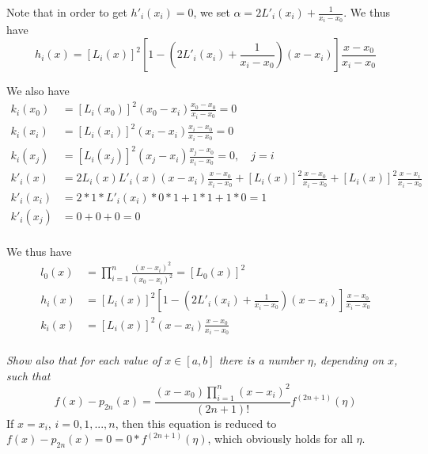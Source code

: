 Note that in order to get $h'_i(x_i) = 0$, we set $\alpha = 2L'_i(x_i) + \frac{1}{x_i - x_0}$. We thus have
\begin{equation*}
    h_i(x) = \left[ L_i(x) \right]^2 \left[1 - \left(2L'_i(x_i) + \frac{1}{x_i - x_0}\right)(x - x_i)\right] \frac{x - x_0}{x_i - x_0}
\end{equation*}

We also have 
\begin{align*}
    k_i(x_0) &= \left[ L_i(x_0) \right]^2 (x_0 - x_i) \frac{x_0 - x_0}{x_i - x_0} = 0 \\
    k_i(x_i) &= \left[ L_i(x_i) \right]^2 (x_i - x_i) \frac{x_i - x_0}{x_i - x_0} = 0 \\
    k_i(x_j) &= \left[ L_i(x_j) \right]^2 (x_j - x_i) \frac{x_j - x_0}{x_i - x_0} = 0, \quad j = i\\
    k'_i(x) &= 2 L_i(x) L'_i(x) (x - x_i) \frac{x - x_0}{x_i - x_0} + \left[ L_i(x) \right]^2 \frac{x - x_0}{x_i - x_0} + \left[ L_i(x) \right]^2 \frac{x - x_i}{x_i - x_0} \\
    k'_i(x_i) &= 2 * 1 * L'_i(x_i) * 0 * 1 + 1 * 1 + 1 * 0 = 1 \\
    k'_i(x_j) &= 0 + 0 + 0 = 0 \\
\end{align*}

We thus have
\begin{align*}
    l_0(x) &= \prod_{i = 1}^n \frac{\left( x - x_i \right)^2}{\left( x_0 - x_i \right)^2} = \left[ L_0(x) \right]^2\\
    h_i(x) &= \left[ L_i(x) \right]^2 \left[1 - \left(2L'_i(x_i) + \frac{1}{x_i - x_0}\right)(x - x_i)\right] \frac{x - x_0}{x_i - x_0} \\
    k_i(x) &= \left[ L_i(x) \right]^2 (x - x_i) \frac{x - x_0}{x_i - x_0} \\
\end{align*}



\textit{Show also that for each value of $x \in [a, b]$ there is a number $\eta$, depending on $x$, such that}
\begin{equation*}
    f(x) - p_{2n}(x) = \frac{(x - x_0) \prod_{i = 1}^n (x - x_i)^2}{(2n + 1)!} f^{(2n+1)}(\eta)
\end{equation*}
If $x = x_i$, $i = 0, 1, ..., n$, then this equation is reduced to $f(x) - p_{2n}(x) = 0 = 0 * f^{(2n+1)}(\eta)$, which obviously holds for all $\eta$.

